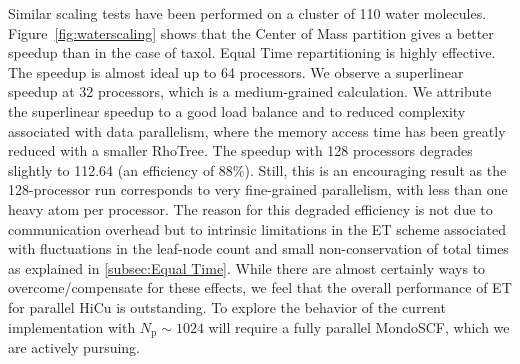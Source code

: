 \commentoutA{\documentclass[prl,aps,twocolumn,showpacs,twocolumngrid,superbib]{revtex4}}
\newcommand{\Np}{N_{\mathrm{p}}} \newcommand{\Nbox}{N_{\mathrm{b}}}
\begin{document}
Similar scaling tests have been performed on a cluster of 110 water
molecules.  Figure~\ref{fig:waterscaling} shows that the Center of
Mass partition gives a better speedup than in the case of taxol.
Equal Time repartitioning is highly effective.  The speedup
is almost ideal up to 64 processors. We observe a superlinear speedup
at 32 processors, which is a medium-grained calculation.  We attribute
the superlinear speedup to a good load balance and to reduced
complexity associated with data parallelism, where the memory access
time has been greatly reduced with a smaller RhoTree.  The speedup
with 128 processors degrades slightly to 112.64 (an efficiency of
88\%).  Still, this is an encouraging result as the 128-processor run
corresponds to very fine-grained parallelism, with less than one heavy
atom per processor. The reason for this degraded efficiency is not due
to communication overhead but to intrinsic limitations in the ET
scheme associated with fluctuations in the leaf-node count and small
non-conservation of total times as explained in
\ref{subsec:Equal Time}.  While there are almost certainly ways to
overcome/compensate for these effects, we feel that the overall
performance of ET for parallel HiCu is outstanding.  To explore
the behavior of the current implementation with $\Np \sim 1024 $ will 
require a fully parallel {\sc MondoSCF}, which we are actively pursuing.
\end{document}
